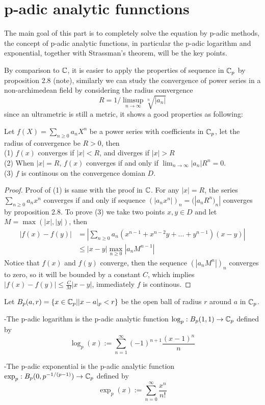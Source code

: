 \section{p-adic analytic funnctions}

The main goal of this part is to completely solve the equation by p-adic methods, the concept of p-adic analytic functions, in particular the p-adic logarithm and exponential, together with Strassman's theorem, will be the key points.

By comparison to \(\mathbb{C}\), it is easier to apply the properties of sequence in \(\mathbb{C}_p\) by proposition 2.8 (note), similarly we can study the convergence of power series in a non-archimedean field by considering the radius convergence
\[R = 1/\limsup_{n \rightarrow \infty}\sqrt[n]{|a_n|}\]
since an ultrametric is still a metric, it shows a good properties as following:
\begin{proposition}
    Let \(f(X)=\sum_{n \geq 0}a_nX^n\) be a power series with coefficients in \(\mathbb{C}_p\), let the radius of convergence be \(R>0\), then\\
    (1) \(f(x)\) converges if \(|x|<R\), and diverges if \(|x|>R\)\\
    (2) When \(|x|=R\), \(f(x)\) converges if and only if \(\lim_{n \rightarrow \infty}|a_n|R^n = 0\). \\
    (3) \(f\) is continous on the convergence domian \(D\).

    \begin{proof}
        Proof of (1) is same with the proof in \(\mathbb{C}\). For any \(|x|=R\), the series \(\sum_{n \geq 0}a_nx^n\) converges if and only if sequence \((|a_nx^n|)_{n} = (|a_nR^n)_{n}|\) converges by proposition 2.8. To prove (3) we take two points \(x,y\in D\) and let \(M = \max(|x|,|y|)\), then
        \begin{align*}
            |f(x)-f(y)| &= |\sum_{n \geq 0}a_n(x^{n-1}+x^{n-2}y+...+y^{n-1})(x-y)| \\
            &\leq |x-y|\max_{n\geq 0}{|a_nM^{n-1}|}
        \end{align*}
        Notice that \(f(x)\) and \(f(y)\) converge, then the sequence \((|a_nM^n|)_{n}\) converges to zero, so it will be bounded by a constant \(C\), which implies \(|f(x)-f(y)|\leq\frac{C}{M}|x-y|\), immediately \(f\) is continous.
    \end{proof}
\end{proposition}


\begin{definition}
    Let \(B_p(a,r) = \{x \in \mathbb{C}_p| |x-a|_p <r \}\) be  the open ball of radius \(r\) around \(a\) in \(\mathbb{C}_p\).

    -The p-adic logarithm is the p-adic analytic function \(\log_p: B_p(1,1) \to \mathbb{C}_p\) defined by
    \[\log_p(x) := \sum_{n=1}^{\infty} (-1)^{n+1} \frac{(x-1)^n}{n}\]

    -The p-adic exponential is the p-adic analytic function \(\exp_p : B_p(0,p^{-1/(p-1)}) \to \mathbb{C}_p\) defined by
    \[\exp_p (x) :=  \sum_{n=0}^{\infty} \frac{x^n}{n!}\]
\end{definition}

